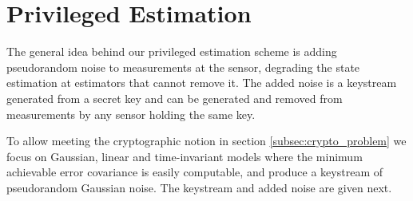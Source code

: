 \documentclass[letterpaper, 10 pt, conference]{IEEEtran}
\theoremstyle{definition}
\begin{document}
% 
%                                                                                
%                                                                                
%                                                                                
% 

\section{Privileged Estimation}\label{sec:priv_estimation}
The general idea behind our privileged estimation scheme is adding pseudorandom noise to measurements at the sensor, degrading the state estimation at estimators that cannot remove it. The added noise is a keystream generated from a secret key and can be generated and removed from measurements by any sensor holding the same key.

To allow meeting the cryptographic notion in section \ref{subsec:crypto_problem} we focus on Gaussian, linear and time-invariant models where the minimum achievable error covariance is easily computable, and produce a keystream of pseudorandom Gaussian noise. The keystream and added noise are given next.

% 
% 
\end{document}
